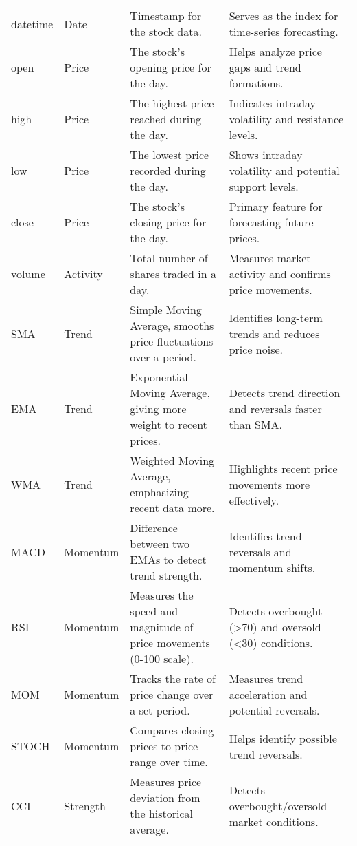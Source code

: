 \begin{longtable}{llp{5cm}p{5cm}}
    \hline
    \endlastfoot
        datetime & Date 
        & Timestamp for the stock data. 
        & Serves as the index for time-series forecasting. \\
        open & Price 
        & The stock's opening price for the day. 
        & Helps analyze price gaps and trend formations. \\
        high & Price 
        & The highest price reached during the day. 
        & Indicates intraday volatility and resistance levels. \\
        low & Price 
        & The lowest price recorded during the day. 
        & Shows intraday volatility and potential support levels. \\
        close & Price 
        & The stock's closing price for the day. & Primary feature for forecasting future prices. \\
        volume & Activity 
        & Total number of shares traded in a day. 
        & Measures market activity and confirms price movements. \\
        SMA & Trend 
        & Simple Moving Average, smooths price fluctuations over a period. 
        & Identifies long-term trends and reduces price noise. \\
        EMA & Trend 
        & Exponential Moving Average, giving more weight to recent prices. 
        & Detects trend direction and reversals faster than SMA. \\
        WMA & Trend 
        & Weighted Moving Average, emphasizing recent data more. 
        & Highlights recent price movements more effectively. \\
        MACD & Momentum 
        & Difference between two EMAs to detect trend strength. 
        & Identifies trend reversals and momentum shifts. \\
        RSI 
        & Momentum 
        & Measures the speed and magnitude of price movements (0-100 scale). 
        & Detects overbought (>70) and oversold (<30) conditions. \\
        MOM & Momentum 
        & Tracks the rate of price change over a set period. 
        & Measures trend acceleration and potential reversals. \\
        STOCH & Momentum
        & Compares closing prices to price range over time. 
        & Helps identify possible trend reversals. \\
        CCI & Strength 
        & Measures price deviation from the historical average. 
        & Detects overbought/oversold market conditions. \\

\end{longtable}
